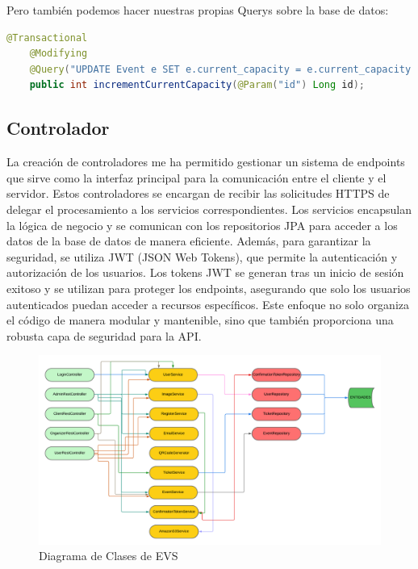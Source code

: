 Pero también podemos hacer nuestras propias Querys sobre la base de datos:
\myjavastyle
\begin{lstlisting}[language=Java, caption=Ejemplo de Query  en Spring Data JPA]
    @Transactional
    @Modifying
    @Query("UPDATE Event e SET e.current_capacity = e.current_capacity + 1 WHERE e.id = :id AND e.current_capacity + 1  <= e.max_capacity")
    public int incrementCurrentCapacity(@Param("id") Long id);
\end{lstlisting}

\subsection{Controlador}
La creación de controladores me ha permitido gestionar un sistema de endpoints que sirve como la interfaz principal 
para la comunicación entre el cliente y el servidor. Estos controladores se encargan de recibir las solicitudes HTTPS de delegar el procesamiento a 
los servicios correspondientes. Los servicios encapsulan la lógica de negocio y se comunican con los repositorios JPA para acceder a los datos de la 
base de datos de manera eficiente. Además, para garantizar la seguridad, se utiliza JWT (JSON Web Tokens), que permite la autenticación y autorización 
de los usuarios. Los tokens JWT se generan tras un inicio de sesión exitoso y se utilizan para proteger los endpoints, asegurando que solo los usuarios 
autenticados puedan acceder a recursos específicos. Este enfoque no solo organiza el código de manera modular y mantenible, sino que también proporciona 
una robusta capa de seguridad para la API.
\begin{figure}[h]
    \centering
    \includegraphics[width=1\textwidth]{DiagramaClases.png} 
    \caption{Diagrama de Clases de EVS}
    \label{fig:class_architecture}
\end{figure}


